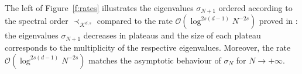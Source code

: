 \documentclass[twoside,11pt]{book}
\numberwithin{theorem}{chapter}
\numberwithin{definition}{chapter}
\numberwithin{proposition}{chapter}
\numberwithin{corollary}{chapter}
\numberwithin{example}{chapter}
\numberwithin{lemma}{chapter}
\numberwithin{assumption}{chapter}
\begin{document}
The left of Figure~\ref{f:rates} illustrates the eigenvalues $\sigma_{N+1}$ ordered according to the spectral order $\prec_{\mathcal{K}^{d,s}}$ compared to the rate $\mathcal{O}(\log^{2s(d-1)} N^{-2s})$ proved in \citep{Bac17}: the eigenvalues $\sigma_{N+1}$ decreases in plateaus and the size of each plateau corresponds to the multiplicity of the respective eigenvalues. Moreover, the rate $\mathcal{O}(\log^{2s(d-1)} N^{-2s})$ matches the asymptotic behaviour of $\sigma_{N}$ for $N \rightarrow +\infty$.



\end{document}

